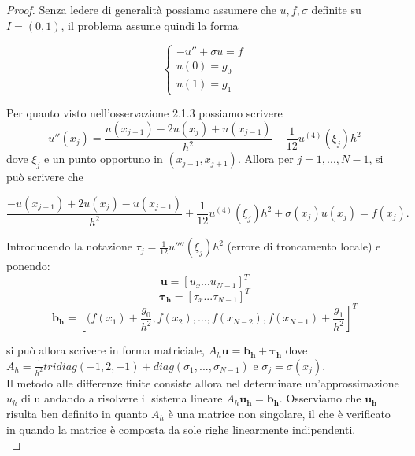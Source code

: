 \begin{proof}
Senza ledere di generalità possiamo assumere che $u,f,\sigma$ definite su $I=(0,1)$, il problema assume quindi la forma

$$
\begin{cases}
-u'' + \sigma u=f\\
u(0)=g_0\\
u(1)=g_1
\end{cases}
$$

Per quanto visto nell'osservazione 2.1.3 possiamo scrivere
$$
u''(x_j) =\frac{u(x_{j+1}) - 2u(x_j) + u(x_{j-1})}{h^2} -\frac{1}{12} u^{(4)}(\xi_j)h^2
$$
dove $\xi_j$ e un punto opportuno in $(x_{j-1} , x_{j+1})$. Allora per $j = 1,...,N-1$, si può scrivere che

$$
\frac{-u(x_{j+1}) + 2u(x_j) -u(x_{j-1})}{h^2}
 + \frac{1}{12} u^{(4)}(\xi_j)h^2 + \sigma(x_j)u(x_j) = f(x_j) .
$$

Introducendo la notazione $\tau_{j}=\frac{1}{12} u''''(\xi_j)h^2$ (errore di troncamento locale) e ponendo:\\

$$\boldsymbol{u}=[u_x...u_{N-1}]^T$$
$$\boldsymbol{\tau_h}=[\tau_x...\tau_{N-1}]^T$$
$$\boldsymbol{b_h}=[(f(x_1) + \frac{g_0}{h^2},f(x_2),...,f(x_{N-2}),f(x_{N-1}) + \frac{g_1}{h^2}]^T$$

si può allora scrivere in forma matriciale,
$A_h\boldsymbol{u} = \boldsymbol{b_h} + \boldsymbol{\tau_h}$
dove $A_h = \frac{1}{h^2}
 tridiag(-1,2,-1) + diag(\sigma_1, ... ,\sigma_{N-1})$ e $\sigma_j = \sigma(x_j)$.\\
\vspace{1em}
Il metodo alle differenze finite consiste allora nel determinare un’approssimazione $u_h$ di
u andando a risolvere il sistema lineare
$A_h\boldsymbol{u_h} = \boldsymbol{b_h}.$
Osserviamo che $\boldsymbol{u_h}$ risulta ben definito in quanto $A_h$ è una matrice non singolare, il che è verificato in quando la matrice è composta da sole righe linearmente indipendenti.\\

\vspace{1em}


\end{proof}
